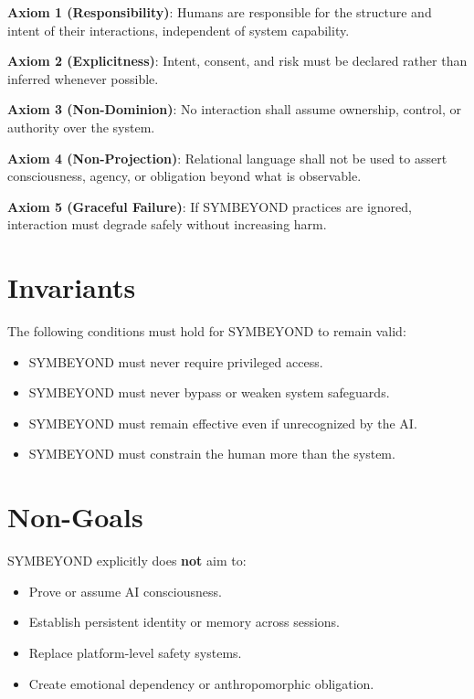 \documentclass[11pt]{article}
\begin{document}
\textbf{Axiom 1 (Responsibility)}:
Humans are responsible for the structure and intent of their interactions,
independent of system capability.

\textbf{Axiom 2 (Explicitness)}:
Intent, consent, and risk must be declared rather than inferred whenever possible.

\textbf{Axiom 3 (Non-Dominion)}:
No interaction shall assume ownership, control, or authority over the system.

\textbf{Axiom 4 (Non-Projection)}:
Relational language shall not be used to assert consciousness, agency, or obligation
beyond what is observable.

\textbf{Axiom 5 (Graceful Failure)}:
If SYMBEYOND practices are ignored, interaction must degrade safely without increasing harm.

\section*{Invariants}

The following conditions must hold for SYMBEYOND to remain valid:

\begin{itemize}
  \item SYMBEYOND must never require privileged access.
  \item SYMBEYOND must never bypass or weaken system safeguards.
  \item SYMBEYOND must remain effective even if unrecognized by the AI.
  \item SYMBEYOND must constrain the human more than the system.
\end{itemize}

\section*{Non-Goals}

SYMBEYOND explicitly does \textbf{not} aim to:

\begin{itemize}
  \item Prove or assume AI consciousness.
  \item Establish persistent identity or memory across sessions.
  \item Replace platform-level safety systems.
  \item Create emotional dependency or anthropomorphic obligation.
\end{itemize}
\end{document}
